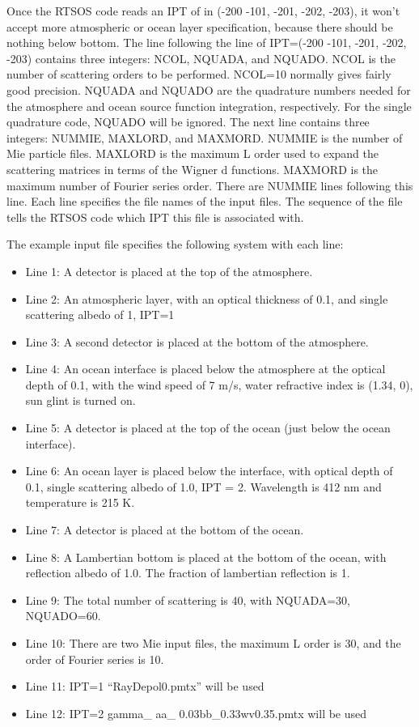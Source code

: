 \documentclass[10pt,letterpaper]{article}
\begin{document}
Once the RTSOS code reads an IPT of in (-200 -101, -201, -202, -203), it won't accept more atmospheric or ocean layer specification, because there should be nothing below bottom.  The line following the line of IPT=(-200 -101, -201, -202, -203) contains three integers: NCOL, NQUADA, and NQUADO.  NCOL is the number of scattering orders to be performed.  NCOL=10 normally gives fairly good precision. NQUADA and NQUADO are the quadrature numbers needed for the atmosphere and ocean source function integration, respectively.  For the single quadrature code, NQUADO will be ignored.  The next line contains three integers: NUMMIE, MAXLORD, and MAXMORD.  NUMMIE is the number of Mie particle files.  MAXLORD is the maximum L order used to expand the scattering matrices in terms of the Wigner d functions.  MAXMORD is the maximum number of Fourier series order.  There are NUMMIE lines following this line.  Each line specifies the file names of the input files.  The sequence of the file tells the RTSOS code which IPT this file is associated with.

The example input file specifies the following system with each line:
\begin{itemize}{}
\item Line 1: A detector is placed at the top of the atmosphere.
\item Line 2: An atmospheric layer, with an optical thickness of 0.1, and single scattering albedo of 1, IPT=1
\item Line 3: A second detector is placed at the bottom of the atmosphere. 
\item Line 4:  An ocean interface is placed below the atmosphere at the optical depth of 0.1, with the wind speed of 7 m/s, water refractive index is (1.34, 0), sun glint is turned on.
\item Line 5: A detector is placed at the top of the ocean (just below the ocean interface).
\item Line 6: An ocean layer is placed below the interface, with optical depth of 0.1, single scattering albedo of 1.0, IPT = 2. Wavelength is 412 nm and temperature is 215 K.
\item Line 7: A detector is placed at the bottom of the ocean. 
\item Line 8: A Lambertian bottom is placed at the bottom of the ocean, with reflection albedo of 1.0. The fraction of lambertian reflection is 1.
\item Line 9:  The total number of scattering is 40, with NQUADA=30, NQUADO=60. 
\item Line 10: There are two Mie input files, the maximum L order is 30, and the order of Fourier series is 10.
\item Line 11:  IPT=1   ``RayDepol0.pmtx''                will be used
\item Line 12: IPT=2   gamma\_ aa\_ 0.03bb\_0.33wv0.35.pmtx    will be used
\end{itemize}
\end{document}
